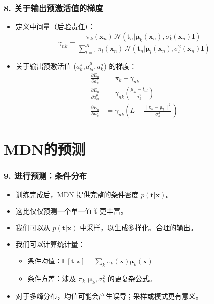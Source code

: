 \documentclass[t,aspectratio=169]{beamer} %
\begin{document}
\begin{frame}
    \frametitle{8. 关于输出预激活值的梯度}
    \begin{itemize}
        \item 定义中间量（后验责任）：
        \begin{equation*}
            \gamma_{nk} = \frac{\pi_k(\mathbf{x}_n) \, \mathcal{N}(\mathbf{t}_n | \boldsymbol{\mu}_k(\mathbf{x}_n), \sigma_k^2(\mathbf{x}_n) \mathbf{I})}{\sum_{l=1}^{K} \pi_l(\mathbf{x}_n) \, \mathcal{N}(\mathbf{t}_n | \boldsymbol{\mu}_l(\mathbf{x}_n), \sigma_l^2(\mathbf{x}_n) \mathbf{I})}
        \end{equation*}
        \item 关于输出预激活值 ($ a_k^\pi, a_{kl}^\mu, a_k^\sigma $) 的梯度：
        \begin{align*}
            \frac{\partial E_n}{\partial a_k^\pi} &= \pi_k - \gamma_{nk} \\
            \frac{\partial E_n}{\partial a_{kl}^\mu} &= \gamma_{nk} \left( \frac{\mu_{kl} - t_{nl}}{\sigma_k^2} \right) \\
            \frac{\partial E_n}{\partial a_k^\sigma} &= \gamma_{nk} \left( L - \frac{\|\mathbf{t}_n - \boldsymbol{\mu}_k\|^2}{\sigma_k^2} \right)
        \end{align*}
    \end{itemize}
\end{frame}

\section{MDN的预测}
\begin{frame}
    \frametitle{9. 进行预测：条件分布}
    \begin{itemize}
        \item 训练完成后，MDN 提供完整的条件密度 $ p(\mathbf{t} | \mathbf{x}) $。
        \item 这比仅仅预测一个单一值 $ \hat{\mathbf{t}} $ 更丰富。
        \item 我们可以从 $ p(\mathbf{t} | \mathbf{x}) $ 中采样，以生成多样化、合理的输出。
        \item 我们可以计算统计量：
        \begin{itemize}
            \item 条件均值：$ \mathbb{E}[\mathbf{t} | \mathbf{x}] = \sum_k \pi_k(\mathbf{x}) \boldsymbol{\mu}_k(\mathbf{x}) $
            \item 条件方差：涉及 $ \pi_k, \boldsymbol{\mu}_k, \sigma_k^2 $ 的更复杂公式。
        \end{itemize}
        \item 对于多峰分布，均值可能会产生误导；采样或模式更有意义。
    \end{itemize}
\end{frame}
\end{document}
